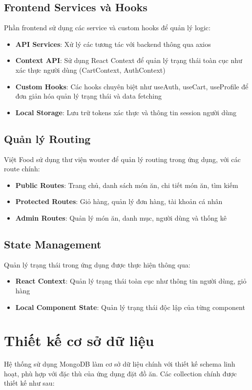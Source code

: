 \subsection{Frontend Services và Hooks}
Phần frontend sử dụng các service và custom hooks để quản lý logic:
\begin{itemize}
    \item \textbf{API Services}: Xử lý các tương tác với backend thông qua axios
    \item \textbf{Context API}: Sử dụng React Context để quản lý trạng thái toàn cục như xác thực người dùng (CartContext, AuthContext)
    \item \textbf{Custom Hooks}: Các hooks chuyên biệt như useAuth, useCart, useProfile để đơn giản hóa quản lý trạng thái và data fetching
    \item \textbf{Local Storage}: Lưu trữ tokens xác thực và thông tin session người dùng
\end{itemize}

\subsection{Quản lý Routing}
Việt Food sử dụng thư viện wouter để quản lý routing trong ứng dụng, với các route chính:
\begin{itemize}
    \item \textbf{Public Routes}: Trang chủ, danh sách món ăn, chi tiết món ăn, tìm kiếm
    \item \textbf{Protected Routes}: Giỏ hàng, quản lý đơn hàng, tài khoản cá nhân
    \item \textbf{Admin Routes}: Quản lý món ăn, danh mục, người dùng và thống kê
\end{itemize}

\subsection{State Management}
Quản lý trạng thái trong ứng dụng được thực hiện thông qua:
\begin{itemize}
    \item \textbf{React Context}: Quản lý trạng thái toàn cục như thông tin người dùng, giỏ hàng
    \item \textbf{Local Component State}: Quản lý trạng thái độc lập của từng component
\end{itemize}

\section{Thiết kế cơ sở dữ liệu}
Hệ thống sử dụng MongoDB làm cơ sở dữ liệu chính với thiết kế schema linh hoạt, phù hợp với đặc thù của ứng dụng đặt đồ ăn. Các collection chính được thiết kế như sau:

